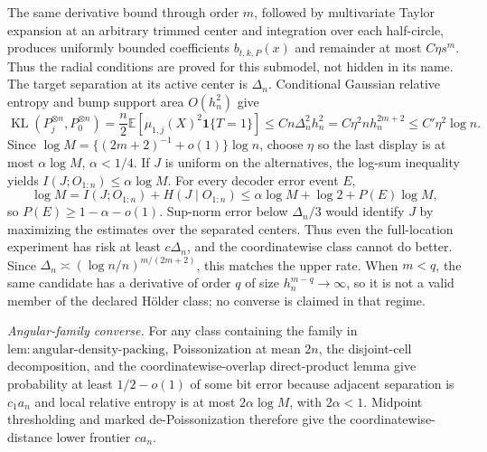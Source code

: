 The same derivative bound through order \(m\), followed by multivariate Taylor expansion at an arbitrary trimmed center and integration over each half-circle, produces uniformly bounded coefficients \(b_{t,k,P}(x)\) and remainder at most \(C\eta s^m\).  Thus the radial conditions are proved for this submodel, not hidden in its name.  The target separation at its active center is \(\Delta_n\).  Conditional Gaussian relative entropy and bump support area \(O(h_n^2)\) give
\[
\operatorname{KL}(P_j^{\otimes n},P_0^{\otimes n})
=\frac n2\mathbb E\!\left[\mu_{1,j}(X)^2\mathbf1\{T=1\}\right]
\leq Cn\Delta_n^2h_n^2=C\eta^2nh_n^{2m+2}\leq C'\eta^2\log n.
\]
Since \(\log M=\{(2m+2)^{-1}+o(1)\}\log n\), choose \(\eta\) so the last display is at most \(\alpha\log M\), \(\alpha<1/4\).  If \(J\) is uniform on the alternatives, the log-sum inequality yields \(I(J;O_{1:n})\leq\alpha\log M\).  For every decoder error event \(E\),
\[
\log M=I(J;O_{1:n})+H(J\mid O_{1:n})
\leq\alpha\log M+\log2+P(E)\log M,
\]
so \(P(E)\geq1-\alpha-o(1)\).  Sup-norm error below \(\Delta_n/3\) would identify \(J\) by maximizing the estimates over the separated centers.  Thus even the full-location experiment has risk at least \(c\Delta_n\), and the coordinatewise class cannot do better.  Since \(\Delta_n\asymp(\log n/n)^{m/(2m+2)}\), this matches the upper rate.  When \(m<q\), the same candidate has a derivative of order \(q\) of size \(h_n^{m-q}\to\infty\), so it is not a valid member of the declared H\"older class; no converse is claimed in that regime.

\emph{Angular-family converse.}
For any class containing the family in \(\mathrm{lem:angular\text{-}density\text{-}packing}\), Poissonization at mean \(2n\), the disjoint-cell decomposition, and the coordinatewise-overlap direct-product lemma give probability at least \(1/2-o(1)\) of some bit error because adjacent separation is \(c_1a_n\) and local relative entropy is at most \(2\alpha\log M\), with \(2\alpha<1\).  Midpoint thresholding and marked de-Poissonization therefore give the coordinatewise-distance lower frontier \(ca_n\).

